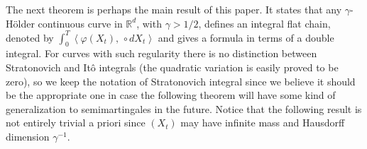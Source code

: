 \documentclass{article}
\begin{document}
The next theorem is perhaps the main result of this paper. It states that
any $\gamma $-H\"{o}lder continuous curve in $\mathbb{R}^{d}$, with $\gamma >%
1/2$, defines an integral flat chain, denoted by $%
\int_{0}^{T}\left\langle \varphi \left( X_{t}\right) ,\,\circ
dX_{t}\right\rangle $ and gives a formula in terms of a double
integral. 
For curves with such regularity there is no distinction between Stratonovich and It\^{o} integrals (the quadratic
variation is easily proved to be zero), so we keep the notation of
Stratonovich integral since we believe it should be the appropriate one in
case the following theorem will have some kind of generalization to
semimartingales in the future. Notice that the following result is not
entirely trivial a priori since $\left( X_{t}\right) $ may have infinite
mass and Hausdorff dimension $\gamma ^{-1}$.
\end{document}
